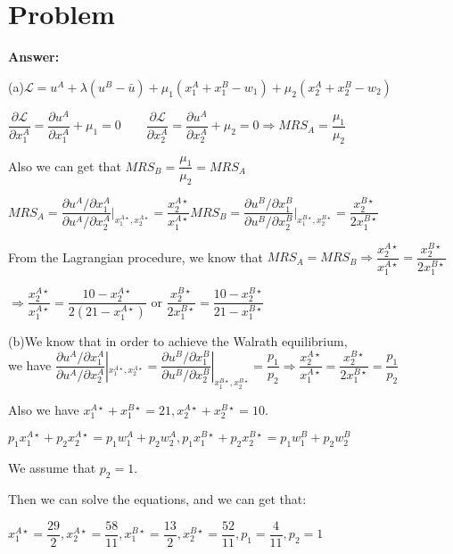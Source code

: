 \documentclass[a4 paper,12pt]{article}
\begin{document}
\section{Problem}
\noindent
\textbf{Answer:}
\par (a)$\mathcal{L}=u^{A}+\lambda(u^{B}-\bar{u})+\mu_{1}(x^{A}_{1}+x^{B}_{1}-w_{1})+\mu_{2}(x^{A}_{2}+x^{B}_{2}-w_{2})$
\par $\dfrac{\partial \mathcal{L}}{\partial x_{1}^{A}}=\dfrac{\partial u^{A}}{\partial x_{1}^{A}}+\mu_{1}=0\qquad \dfrac{\partial \mathcal{L}}{\partial x_{2}^{A}}=\dfrac{\partial u^{A}}{\partial x_{2}^{A}}+\mu_{2}=0\Rightarrow MRS_{A}=\dfrac{\mu_{1}}{\mu_{2}}$
\par Also we can get that $MRS_{B}=\dfrac{\mu_{1}}{\mu_{2}}=MRS_{A}$
\par $MRS_{A}=\dfrac{\partial u^{A}/\partial x_{1}^{A}}{\partial u^{A}/\partial x_{2}^{A}}|_{x_{1}^{A\star},x_{2}^{A\star}}=\dfrac{x_{2}^{A\star}}{x_{1}^{A\star}}$\qquad$MRS_{B}=\dfrac{\partial u^{B}/\partial x_{1}^{B}}{\partial u^{B}/\partial x_{2}^{B}}|_{x_{1}^{B\star},x_{2}^{B\star}}=\dfrac{x_{2}^{B\star}}{2x_{1}^{B\star}}$
\par From the Lagrangian procedure, we know that $MRS_{A}=MRS_{B}\Rightarrow \dfrac{x_{2}^{A\star}}{x_{1}^{A\star}}=\dfrac{x_{2}^{B\star}}{2x_{1}^{B\star}}$
\par $\Rightarrow \dfrac{x_{2}^{A\star}}{x_{1}^{A\star}}=\dfrac{10-x_{2}^{A\star}}{2(21-x_{1}^{A\star})}$ or $\dfrac{x_{2}^{B\star}}{2x_{1}^{B\star}}=\dfrac{10-x_{2}^{B\star}}{21-x_{1}^{B\star}}$
\par (b)We know that in order to achieve the Walrath equilibrium,\\we have $\dfrac{\partial u^{A}/\partial x_{1}^{A}}{\partial u^{A}/\partial x_{2}^{A}}|_{x_{1}^{A\star},x_{2}^{A\star}}=\dfrac{\partial u^{B}/\partial x_{1}^{B}}{\partial u^{B}/\partial x_{2}^{B}}|_{x_{1}^{B\star},x_{2}^{B\star}}=\dfrac{p_{1}}{p_{2}}\Rightarrow \dfrac{x_{2}^{A\star}}{x_{1}^{A\star}}=\dfrac{x_{2}^{B\star}}{2x_{1}^{B\star}}=\dfrac{p_{1}}{p_{2}}$
\par Also we have $x_{1}^{A\star}+x_{1}^{B\star}=21,x_{2}^{A\star}+x_{2}^{B\star}=10$.
\par $p_{1}x_{1}^{A\star}+p_{2}x_{2}^{A\star}=p_{1}w_{1}^{A}+p_{2}w_{2}^{A},p_{1}x_{1}^{B\star}+p_{2}x_{2}^{B\star}=p_{1}w_{1}^{B}+p_{2}w_{2}^{B}$
\par We assume that $p_{2}=1$.
\par Then we can solve the equations, and we can get that: 
\par $x_{1}^{A\star}=\dfrac{29}{2},x_{2}^{A\star}=\dfrac{58}{11},x_{1}^{B\star}=\dfrac{13}{2},x_{2}^{B\star}=\dfrac{52}{11},p_{1}=\dfrac{4}{11},p_{2}=1$ 
\end{document}
